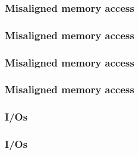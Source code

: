 
\begin{frame}
  \frametitle{Misaligned memory access}

  \begin{center}
  \end{center}

\end{frame}


\begin{frame}
  \frametitle{Misaligned memory access}

  \begin{center}
  \end{center}

\end{frame}


\begin{frame}
  \frametitle{Misaligned memory access}

  \begin{center}
  \end{center}

\end{frame}


\begin{frame}
  \frametitle{Misaligned memory access}

  \begin{center}
  \end{center}

\end{frame}


\begin{frame}
  \frametitle{I/Os}

  \begin{center}
  \end{center}

\end{frame}


\begin{frame}
  \frametitle{I/Os}

  \begin{center}
  \end{center}

\end{frame}

